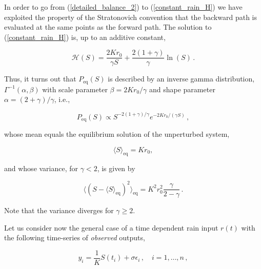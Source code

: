 \documentclass[11pt, a4paper]{article}
\newcommand{\eq}{\text{eq}}
\begin{document}
In order to go from (\ref{detailed_balance_2}) to (\ref{constant_rain_H}) we have exploited the property of the Stratonovich convention that the backward path is evaluated at the same points as the forward path. The solution to (\ref{constant_rain_H}) is, up to an additive constant,

\begin{equation}\label{solution_const_rain}
\mathcal{H}(S)=\frac{2 K r_0}{\gamma S}+\frac{2(1+\gamma)}{\gamma}\ln(S)\,.
\end{equation}


Thus, it turns out that $P_{\text{eq}}(S)$ is described by an inverse gamma distribution, $\Gamma^{-1}(\alpha,\beta)$ with scale parameter $\beta=2Kr_{0}/\gamma$ and shape parameter $\alpha=(2+\gamma)/\gamma$, i.e.,

\begin{equation}\label{inverse_gamma}
  P_{\text{eq}}(S)
  \propto
  S^{-2(1+\gamma)/\gamma}e^{-2Kr_{0}/(\gamma S)}\,,
\end{equation}

whose mean equals the equilibrium solution of the unperturbed system,

\begin{equation}
  \langle S\rangle_{\eq}=Kr_{0},
\end{equation}

and whose variance, for $\gamma< 2$, is given by

\begin{equation}
  \langle (S - \langle S\rangle_{\eq})^2\rangle_{\eq}
  =
  K^2r_{0}^2
  \frac{\gamma}{2-\gamma}\,.
\end{equation}

Note that the variance diverges for $\gamma\geq 2$.

\vspace{\baselineskip}

Let us consider now the general case of a time dependent rain input $r(t)$ with the following time-series of {\em observed} outputs,

\begin{equation}\label{data}
  y_i=\frac{1}{K}S(t_i)+\sigma\epsilon_i\,,\quad i=1,\dots,n\,,
\end{equation}
\end{document}
